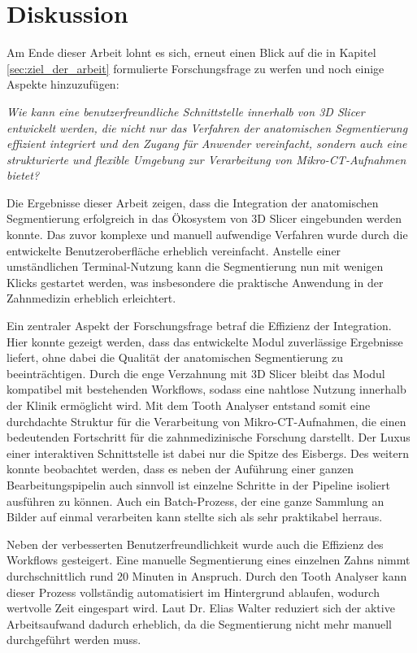 \chapter{Diskussion}
\label{chap:diskussion} Am Ende dieser Arbeit lohnt es sich, erneut einen Blick
auf die in Kapitel \ref{sec:ziel_der_arbeit} formulierte Forschungsfrage zu
werfen und noch einige Aspekte hinzuzufügen:

\textit{Wie kann eine benutzerfreundliche Schnittstelle innerhalb von 3D Slicer
entwickelt werden, die nicht nur das Verfahren der anatomischen Segmentierung effizient
integriert und den Zugang für Anwender vereinfacht, sondern auch eine
strukturierte und flexible Umgebung zur Verarbeitung von Mikro-CT-Aufnahmen
bietet?}

Die Ergebnisse dieser Arbeit zeigen, dass die Integration der anatomischen Segmentierung
erfolgreich in das Ökosystem von 3D Slicer eingebunden werden konnte. Das zuvor
komplexe und manuell aufwendige Verfahren wurde durch die entwickelte
Benutzeroberfläche erheblich vereinfacht. Anstelle einer umständlichen Terminal-Nutzung
kann die Segmentierung nun mit wenigen Klicks gestartet werden, was insbesondere
die praktische Anwendung in der Zahnmedizin erheblich erleichtert.

Ein zentraler Aspekt der Forschungsfrage betraf die Effizienz der Integration. Hier
konnte gezeigt werden, dass das entwickelte Modul zuverlässige Ergebnisse
liefert, ohne dabei die Qualität der anatomischen Segmentierung zu beeinträchtigen.
Durch die enge Verzahnung mit 3D Slicer bleibt das Modul kompatibel mit
bestehenden Workflows, sodass eine nahtlose Nutzung innerhalb der Klinik ermöglicht
wird. Mit dem Tooth Analyser entstand somit eine durchdachte Struktur für die
Verarbeitung von Mikro-CT-Aufnahmen, die einen bedeutenden Fortschritt für die zahnmedizinische
Forschung darstellt. Der Luxus einer interaktiven Schnittstelle ist dabei nur
die Spitze des Eisbergs. Des weitern konnte beobachtet werden, dass es neben der
Auführung einer ganzen Bearbeitungspipelin auch sinnvoll ist einzelne Schritte
in der Pipeline isoliert ausführen zu können. Auch ein Batch-Prozess, der eine
ganze Sammlung an Bilder auf einmal verarbeiten kann stellte sich als sehr
praktikabel herraus.

Neben der verbesserten Benutzerfreundlichkeit wurde auch die Effizienz des
Workflows gesteigert. Eine manuelle Segmentierung eines einzelnen Zahns nimmt durchschnittlich
rund 20 Minuten in Anspruch. Durch den Tooth Analyser kann dieser Prozess
vollständig automatisiert im Hintergrund ablaufen, wodurch wertvolle Zeit eingespart
wird. Laut Dr. Elias Walter reduziert sich der aktive Arbeitsaufwand dadurch erheblich,
da die Segmentierung nicht mehr manuell durchgeführt werden muss.

